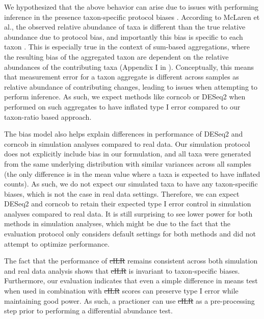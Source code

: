 \documentclass[10pt,letterpaper]{article}
\providecommand{\DIFaddtex}[1]{{\protect\color{blue}\uwave{#1}}} %
\providecommand{\DIFdeltex}[1]{{\protect\color{red}\sout{#1}}}                      %
\providecommand{\DIFaddbegin}{} %
\providecommand{\DIFaddend}{} %
\providecommand{\DIFdelbegin}{} %
\providecommand{\DIFdelend}{} %
\providecommand{\DIFadd}[1]{\texorpdfstring{\DIFaddtex{#1}}{#1}} %
\providecommand{\DIFdel}[1]{\texorpdfstring{\DIFdeltex{#1}}{}} %
\newcommand{\DIFscaledelfig}{0.5}
\newlength{\DIFdelgraphicswidth} %
\newlength{\DIFdelgraphicsheight} %
\newcommand{\DIFaddincludegraphics}[2][]{{\color{blue}\fbox{\DIFOincludegraphics[#1]{#2}}}} %
\newcommand{\DIFdelincludegraphics}[2][]{%
\sbox{\DIFdelgraphicsbox}{\DIFOincludegraphics[#1]{#2}}%
\settoboxwidth{\DIFdelgraphicswidth}{\DIFdelgraphicsbox} %
\settoboxtotalheight{\DIFdelgraphicsheight}{\DIFdelgraphicsbox} %
\scalebox{\DIFscaledelfig}{%
\parbox[b]{\DIFdelgraphicswidth}{\usebox{\DIFdelgraphicsbox}\\[-\baselineskip] \rule{\DIFdelgraphicswidth}{0em}}\llap{\resizebox{\DIFdelgraphicswidth}{\DIFdelgraphicsheight}{%
\setlength{\unitlength}{\DIFdelgraphicswidth}%
\begin{picture}(1,1)%
\thicklines\linethickness{2pt} %
{\color[rgb]{1,0,0}\put(0,0){\framebox(1,1){}}}%
{\color[rgb]{1,0,0}\put(0,0){\line( 1,1){1}}}%
{\color[rgb]{1,0,0}\put(0,1){\line(1,-1){1}}}%
\end{picture}%
}\hspace*{3pt}}} %
} %
\DeclareRobustCommand{\DIFaddbegin}{\DIFOaddbegin \let\includegraphics\DIFaddincludegraphics} %
\DeclareRobustCommand{\DIFaddend}{\DIFOaddend \let\includegraphics\DIFOincludegraphics} %
\DeclareRobustCommand{\DIFdelbegin}{\DIFOdelbegin \let\includegraphics\DIFdelincludegraphics} %
\DeclareRobustCommand{\DIFdelend}{\DIFOaddend \let\includegraphics\DIFOincludegraphics} %
\begin{document}
We hypothesized that the above behavior can arise due to issues with performing inference in the presence taxon-specific protocol biases \cite{mclaren2019}. According to McLaren et al., the observed relative abundance of taxa is different than the true relative abundance due to protocol bias, and importantly this bias is specific to each taxon \cite{mclaren2019}. This is especially true in the context of sum-based aggregations, where the resulting bias of the aggregated taxon are dependent on the relative abundances of the contributing taxa (Appendix I in \cite{mclaren2019}). Conceptually, this means that measurement error for a taxon aggregate is different across samples as relative abundance of contributing changes, leading to issues when attempting to perform inference. As such, we expect methods like corncob or DESeq2 when performed on such aggregates to have inflated type I error compared to our taxon-ratio based approach.  

The bias model also helps explain differences in performance of DESeq2 and corncob in simulation analyses compared to real data. Our simulation protocol does not explicitly include bias in our formulation, and all taxa were generated from the same underlying distribution with similar variances across all samples (the only difference is in the mean value where a taxa is expected to have inflated counts). As such, we do not expect our simulated taxa to have any taxon-specific biases, which is not the case in real data settings. Therefore, we can expect DESeq2 and corncob to retain their expected type I error control in simulation analyses compared to real data. It is still surprising to see lower power for both methods in simulation analyses, which might be due to the fact that the evaluation protocol only considers default settings for both methods and did not attempt to optimize performance. 

The fact that the performance of \DIFdelbegin \DIFdel{cILR }\DIFdelend \DIFaddbegin \DIFadd{CBEA }\DIFaddend remains consistent across both simulation and real data analysis shows that \DIFdelbegin \DIFdel{cILR }\DIFdelend \DIFaddbegin \DIFadd{CBEA }\DIFaddend is invariant to taxon-specific biases. Furthermore, our evaluation indicates that even a simple difference in means test when used in combination with \DIFdelbegin \DIFdel{cILR }\DIFdelend \DIFaddbegin \DIFadd{CBEA }\DIFaddend scores can preserve type I error while maintaining good power. As such, a practioner can use \DIFdelbegin \DIFdel{cILR }\DIFdelend \DIFaddbegin \DIFadd{CBEA }\DIFaddend as a pre-processing step prior to performing a differential abundance test.  
\end{document}
